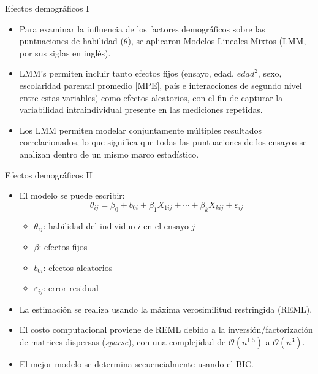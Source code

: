 \documentclass[aspectratio=169]{beamer}
\begin{document}
\begin{frame}{Efectos demográficos I}
	\begin{itemize}
		\item Para examinar la influencia de los factores demográficos sobre las puntuaciones de habilidad ($\theta$), se aplicaron Modelos Lineales Mixtos (LMM, por sus siglas en inglés).
		\vspace{10pt}
		\item LMM's permiten incluir tanto efectos fijos (ensayo, edad, $edad^2$, sexo, escolaridad parental promedio [MPE], país e interacciones de segundo nivel entre estas variables) como efectos aleatorios, con el fin de capturar la variabilidad intraindividual presente en las mediciones repetidas.
		\vspace{10pt}
		\item Los LMM permiten modelar conjuntamente múltiples resultados correlacionados, lo que significa que todas las puntuaciones de los ensayos se analizan dentro de un mismo marco estadístico.
	\end{itemize}
\end{frame}


\begin{frame}{Efectos demográficos II}
	\begin{itemize}
		\item El modelo se puede escribir:
			\[\theta_{ij} = \beta_0+b_{0i} +\beta_1X_{1ij} +\cdots+ \beta_kX_{kij} +\varepsilon_{ij}\]
				\begin{itemize}
				\item[$\bullet$] $\theta_{ij}$: habilidad del individuo $i$ en el ensayo $j$
				\item[$\bullet$] $\beta$: efectos fijos
				\item[$\bullet$] $b_{0i}$: efectos aleatorios
				\item[$\bullet$] $\varepsilon_{ij}$: error residual
			\end{itemize}
		\vspace{10pt}
		\item La estimación se realiza usando la máxima verosimilitud restringida (REML).
			\vspace{10pt}
			\item El costo computacional proviene de REML debido a la inversión/factorización de matrices dispersas (\textit{sparse}), con una complejidad de $\mathcal{O}(n^{1.5})$ a $\mathcal{O}(n^3)$.
			\vspace{10pt}
			\item El mejor modelo se determina secuencialmente usando el BIC.
	\end{itemize}

\end{frame}
\end{document}
